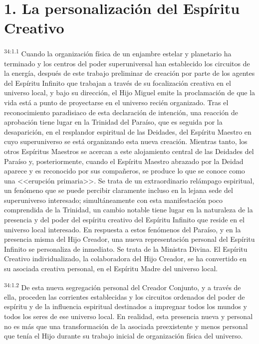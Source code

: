 \section*{1. La personalización del Espíritu Creativo}
\par
\textsuperscript{34:1.1} Cuando la organización física de un enjambre estelar y planetario ha terminado y los centros del poder superuniversal han establecido los circuitos de la energía, después de este trabajo preliminar de creación por parte de los agentes del Espíritu Infinito que trabajan a través de su focalización creativa en el universo local, y bajo su dirección, el Hijo Miguel emite la proclamación de que la vida está a punto de proyectarse en el universo recién organizado. Tras el reconocimiento paradisiaco de esta declaración de intención, una reacción de aprobación tiene lugar en la Trinidad del Paraíso, que es seguida por la desaparición, en el resplandor espiritual de las Deidades, del Espíritu Maestro en cuyo superuniverso se está organizando esta nueva creación. Mientras tanto, los otros Espíritus Maestros se acercan a este alojamiento central de las Deidades del Paraíso y, posteriormente, cuando el Espíritu Maestro abrazado por la Deidad aparece y es reconocido por sus compañeros, se produce lo que se conoce como una <<erupción primaria>>. Se trata de un extraordinario relámpago espiritual, un fenómeno que se puede percibir claramente incluso en la lejana sede del superuniverso interesado; simultáneamente con esta manifestación poco comprendida de la Trinidad, un cambio notable tiene lugar en la naturaleza de la presencia y del poder del espíritu creativo del Espíritu Infinito que reside en el universo local interesado. En respuesta a estos fenómenos del Paraíso, y en la presencia misma del Hijo Creador, una nueva representación personal del Espíritu Infinito se personaliza de inmediato. Se trata de la Ministra Divina. El Espíritu Creativo individualizado, la colaboradora del Hijo Creador, se ha convertido en su asociada creativa personal, en el Espíritu Madre del universo local.

\par
\textsuperscript{34:1.2} De esta nueva segregación personal del Creador Conjunto, y a través de ella, proceden las corrientes establecidas y los circuitos ordenados del poder de espíritu y de la influencia espiritual destinados a impregnar todos los mundos y todos los seres de ese universo local. En realidad, esta presencia nueva y personal no es más que una transformación de la asociada preexistente y menos personal que tenía el Hijo durante su trabajo inicial de organización física del universo.

